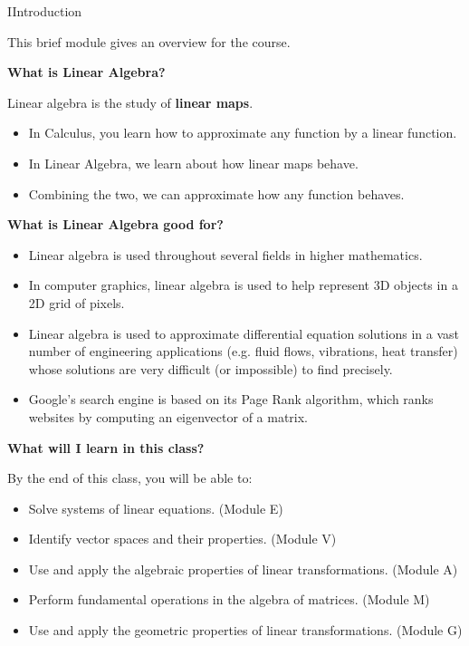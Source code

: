 \begin{module}{I}{Introduction}

\begin{remark}
  This brief module gives an overview for the course.
\end{remark}


\begin{applicationActivities}

\begin{remark} \textbf{What is Linear Algebra?}

  Linear algebra is the study of \textbf{linear maps}.

  \begin{itemize}
  \item In Calculus, you learn how to approximate any function by a
        linear function.
  \item In Linear Algebra, we learn about how linear maps behave.
  \item Combining the two, we can approximate how any function behaves.
  \end{itemize}
\end{remark}

\begin{remark} \textbf{What is Linear Algebra good for?}
  \begin{itemize}
  \item Linear algebra is used throughout several fields
        in higher mathematics.
  \item In computer graphics, linear algebra is used to help represent
        3D objects in a 2D grid of pixels.
  \item Linear algebra is used to approximate
        differential equation solutions in a vast number of engineering
        applications (e.g. fluid flows, vibrations, heat transfer) whose
        solutions are very difficult (or impossible) to find precisely.
  \item Google's search engine is based on its Page Rank algorithm, which
        ranks websites by computing an eigenvector of a matrix.
  \end{itemize}
\end{remark}

\begin{remark} \textbf{What will I learn in this class?}

  By the end of this class, you will be able to:
  \begin{itemize}
  \item Solve systems of linear equations.
        (Module E)
  \item Identify vector spaces and their properties.
        (Module V)
  \item Use and apply the algebraic properties of linear transformations.
        (Module A)
  \item Perform fundamental operations in the algebra of matrices.
        (Module M)
  \item Use and apply the geometric properties of linear transformations.
        (Module G)
  \end{itemize}
\end{remark}

\end{applicationActivities}
\end{module}
